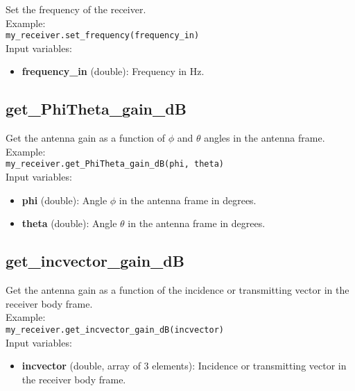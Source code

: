 Set the frequency of the receiver.\\

Example:\\

\texttt{my\_receiver.set\_frequency(frequency\_in)}\\

Input variables:
\begin{itemize}
\item {\bf frequency\_in} (double): Frequency in Hz.
\end{itemize}


\subsection{get\_PhiTheta\_gain\_dB}

Get the antenna gain as a function of $\phi$ and $\theta$ angles in the antenna frame.\\

Example:\\

\texttt{my\_receiver.get\_PhiTheta\_gain\_dB(phi, theta)}\\

Input variables:
\begin{itemize}
\item {\bf phi} (double): Angle $\phi$ in the antenna frame in degrees.
\item {\bf theta} (double): Angle $\theta$ in the antenna frame in degrees.
\end{itemize}


\subsection{get\_incvector\_gain\_dB}

Get the antenna gain as a function of the incidence or transmitting vector in the receiver body frame.\\

Example:\\

\texttt{my\_receiver.get\_incvector\_gain\_dB(incvector)}\\

Input variables:
\begin{itemize}
\item {\bf incvector} (double, array of 3 elements): Incidence or transmitting vector in the receiver body frame.
\end{itemize}


